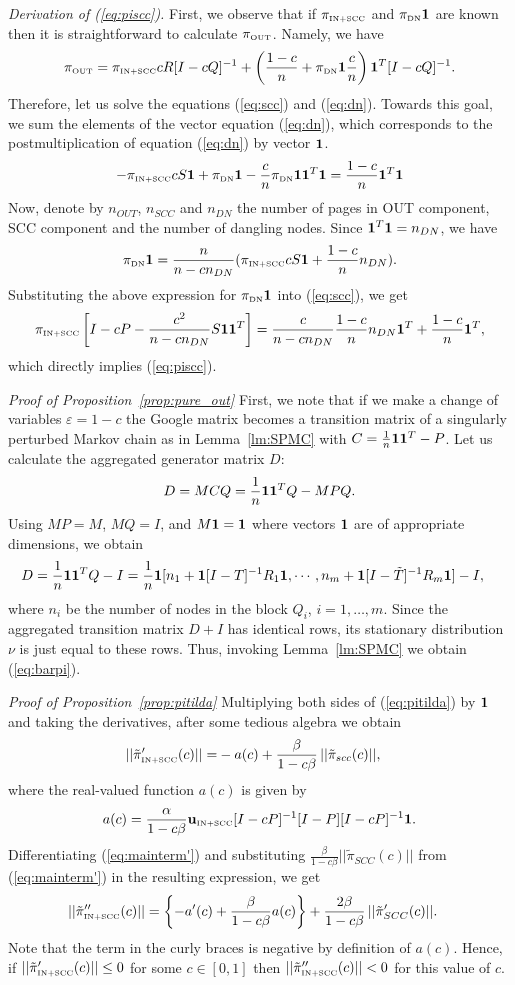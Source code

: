 \documentclass{article}
\newcommand{\eps}{\varepsilon}
\newcommand{\one}{{\bf 1}}
\newcommand{\pidn}{\pi_{\mbox{\tiny DN}}}
\newcommand{\onedn}{{\bf 1}}
\newcommand{\piscc}{\pi_{\mbox{\tiny IN+SCC}}}
\newcommand{\scc}{{\mbox{\tiny IN+SCC}}}
\newcommand{\onescc}{{\bf 1}}
\newcommand{\piout}{\pi_{\mbox{\tiny OUT}}}
\newcommand{\oneout}{{\bf 1}}
\def\u{{{\bf u}_{\mbox{\tiny IN+SCC}}}}
\begin{document}
{\it Derivation of (\ref{eq:piscc}).} First, we
observe that if $\piscc$ and $\pidn\onedn$ are known then it is
straightforward to calculate $\piout$. Namely, we have
$$
\piout = \piscc cR[I-cQ]^{-1} +\left(\frac{1-c}{n}+\pidn\onedn
\frac{c}{n}\right)\oneout^T[I-cQ]^{-1}.
$$
Therefore, let us solve the equations (\ref{eq:scc}) and
(\ref{eq:dn}). Towards this goal, we sum the elements of the
vector equation (\ref{eq:dn}), which corresponds to the
postmultiplication of equation (\ref{eq:dn}) by vector $\onedn$.
$$
-\piscc cS\onedn+\pidn\onedn-\frac{c}{n}\pidn\onedn\onedn^T\onedn
=\frac{1-c}{n}\onedn^T\onedn
$$
Now, denote by $n_{OUT}$, $n_{SCC}$
and $n_{DN}$ the number of pages in OUT component, SCC component
and the number of dangling nodes. Since $\onedn^T\onedn=n_{DN}$, we have
$$
\pidn\onedn=\frac{n}{n-cn_{DN}}(\piscc
cS\onedn+\frac{1-c}{n}n_{DN}).
$$
Substituting the above expression for $\pidn\onedn$ into
(\ref{eq:scc}), we get
$$
\piscc\left[I-cP-\frac{c^2}{n-cn_{DN}}S\onedn\onescc^T\right]=
\frac{c}{n-cn_{DN}}\frac{1-c}{n}n_{DN}\onescc^T+\frac{1-c}{n}\onescc^T,
$$
which directly implies (\ref{eq:piscc}).



{\it Proof of Proposition~\ref{prop:pure_out}} First, we note that if we make a change of
variables $\eps = 1-c$ the Google matrix becomes a transition
matrix of a singularly perturbed Markov chain as in
Lemma~\ref{lm:SPMC} with $C=\frac{1}{n}\one \one^T -P$. Let us
calculate the aggregated generator matrix $D$:
$$
D=MCQ=\frac{1}{n}\one\one^TQ-MPQ.
$$
Using $MP=M$, $MQ=I$, and $M\one=\one$ where vectors $\one$ are of
appropriate dimensions, we obtain
\begin{align*}
D&=\frac{1}{n}\one\one^TQ-I=
\frac{1}{n}\one[n_1+\one[I-{T}]^{-1}{R}_1\one,\cdots,
n_m+\one[I-\tilde{T}]^{-1}{R}_m\one]-I,
\end{align*}
where $n_i$ be the number of nodes in the block $Q_i$,
$i=1,\ldots,m$. Since the aggregated transition matrix $D+I$ has
identical rows, its stationary distribution $\nu$ is just equal to
these rows. Thus, invoking Lemma~\ref{lm:SPMC} we obtain
(\ref{eq:barpi}). 

\medskip

{\it Proof of Proposition~\ref{prop:pitilda}} Multiplying both sides of (\ref{eq:pitilda}) by $\onescc$
and taking the derivatives, after some tedious algebra we obtain
\begin{align}
||\tilde{\pi}'_\scc(c)|| \label{eq:mainterm'} =&
-a(c)+\frac{\beta}{1-c\beta}\,||\tilde{\pi}_{scc}(c)||,
\end{align}
where the real-valued function $a(c)$ is given by
\[a(c)=\frac{\alpha}{1-c\beta}\u[I-cP]^{-1}[I-P][I-cP]^{-1}\onescc.\]
Differentiating (\ref{eq:mainterm'}) and substituting
$\frac{\beta}{1-c\beta}||\tilde{\pi}_{SCC}(c)||$ from
(\ref{eq:mainterm'}) in the resulting expression, we get
\begin{align*}
||\tilde{\pi}''_\scc(c)||
&=\left\{-a'(c)+
\frac{\beta}{1-c\beta}a(c)\right\}+\frac{2\beta}{1-c\beta}\,||\tilde{\pi}'_{SCC}(c)||.
\end{align*}
Note that the term in the curly braces is negative by definition
of $a(c)$. Hence, if $||\tilde{\pi}'_\scc(c)||\le 0$ for some
$c\in[0,1]$ then $||\tilde{\pi}''_\scc(c)||<0$ for this value of
$c$.
\end{document}
